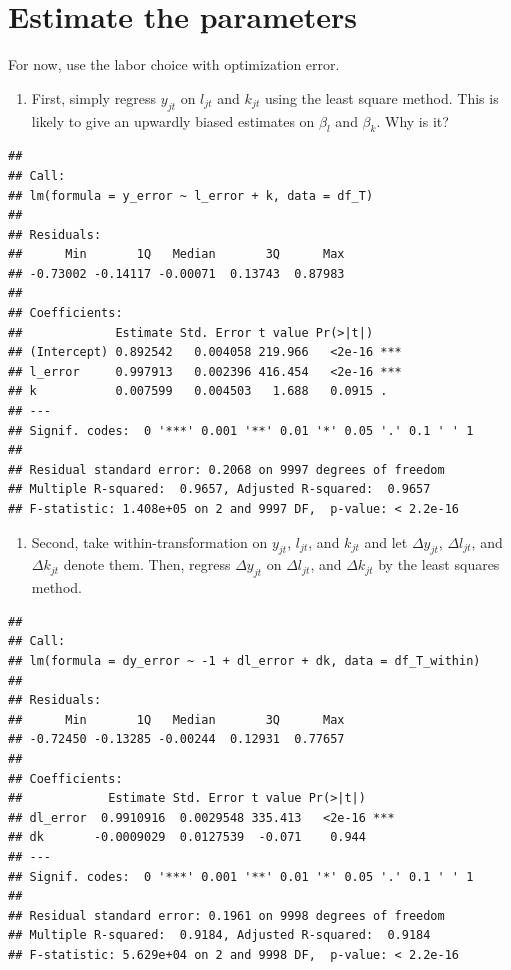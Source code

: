 \documentclass[]{book}
\providecommand{\tightlist}{%
  \setlength{\itemsep}{0pt}\setlength{\parskip}{0pt}}
\begin{document}
\section{Estimate the parameters}\label{estimate-the-parameters}

For now, use the labor choice with optimization error.

\begin{enumerate}
\def\labelenumi{\arabic{enumi}.}
\tightlist
\item
  First, simply regress \(y_{jt}\) on \(l_{jt}\) and \(k_{jt}\) using
  the least square method. This is likely to give an upwardly biased
  estimates on \(\beta_l\) and \(\beta_k\). Why is it?
\end{enumerate}

\begin{verbatim}
## 
## Call:
## lm(formula = y_error ~ l_error + k, data = df_T)
## 
## Residuals:
##      Min       1Q   Median       3Q      Max 
## -0.73002 -0.14117 -0.00071  0.13743  0.87983 
## 
## Coefficients:
##             Estimate Std. Error t value Pr(>|t|)    
## (Intercept) 0.892542   0.004058 219.966   <2e-16 ***
## l_error     0.997913   0.002396 416.454   <2e-16 ***
## k           0.007599   0.004503   1.688   0.0915 .  
## ---
## Signif. codes:  0 '***' 0.001 '**' 0.01 '*' 0.05 '.' 0.1 ' ' 1
## 
## Residual standard error: 0.2068 on 9997 degrees of freedom
## Multiple R-squared:  0.9657, Adjusted R-squared:  0.9657 
## F-statistic: 1.408e+05 on 2 and 9997 DF,  p-value: < 2.2e-16
\end{verbatim}

\begin{enumerate}
\def\labelenumi{\arabic{enumi}.}
\setcounter{enumi}{1}
\tightlist
\item
  Second, take within-transformation on \(y_{jt}\), \(l_{jt}\), and
  \(k_{jt}\) and let \(\Delta y_{jt}\), \(\Delta l_{jt}\), and
  \(\Delta k_{jt}\) denote them. Then, regress \(\Delta y_{jt}\) on
  \(\Delta l_{jt}\), and \(\Delta k_{jt}\) by the least squares method.
\end{enumerate}

\begin{verbatim}
## 
## Call:
## lm(formula = dy_error ~ -1 + dl_error + dk, data = df_T_within)
## 
## Residuals:
##      Min       1Q   Median       3Q      Max 
## -0.72450 -0.13285 -0.00244  0.12931  0.77657 
## 
## Coefficients:
##            Estimate Std. Error t value Pr(>|t|)    
## dl_error  0.9910916  0.0029548 335.413   <2e-16 ***
## dk       -0.0009029  0.0127539  -0.071    0.944    
## ---
## Signif. codes:  0 '***' 0.001 '**' 0.01 '*' 0.05 '.' 0.1 ' ' 1
## 
## Residual standard error: 0.1961 on 9998 degrees of freedom
## Multiple R-squared:  0.9184, Adjusted R-squared:  0.9184 
## F-statistic: 5.629e+04 on 2 and 9998 DF,  p-value: < 2.2e-16
\end{verbatim}
\end{document}
